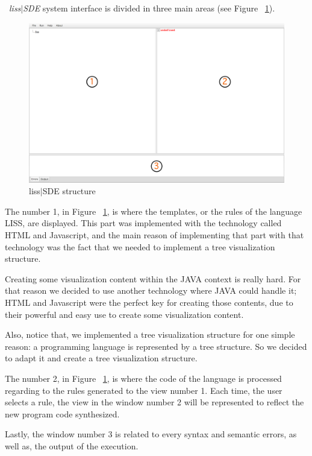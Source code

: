 \documentclass[
  oneside,
  11pt, a4paper,
  footinclude=true,
  headinclude=true,
  cleardoublepage=empty
]{scrbook}
\begin{document}
~\textit{liss$|$SDE} system interface is divided in three main areas (see Figure ~\ref{fig:LISS-SDE_structure}).

\begin{figure}[h!]
  \centering
    \includegraphics[width=1\textwidth]{img/LISS-SDE_organization.png}
    \caption{liss$|$SDE structure}
    \label{fig:LISS-SDE_structure}
\end{figure}

The number 1, in Figure ~\ref{fig:LISS-SDE_structure}, is where the templates, or the rules of the language LISS, are displayed. This part was implemented with the technology called HTML and Javascript, and the main reason of implementing that part with that technology was the fact that we needed to implement a tree visualization structure. 

Creating some visualization content within the JAVA context is really hard. For that reason we decided to use another technology where JAVA could handle it; HTML and Javascript were the perfect key for creating those contents, due to their powerful and easy use to create some visualization content.

Also, notice that, we implemented a tree visualization structure for one simple reason: a programming language is represented by a tree structure. So we decided to adapt it and create a tree visualization structure.

The number 2, in Figure ~\ref{fig:LISS-SDE_structure}, is where the code of the language is processed regarding to the rules generated to the view number 1. Each time, the user selects a rule, the view in the window number 2 will be represented to reflect the new program code synthesized.

Lastly, the window number 3 is related to every syntax and semantic errors, as well as, the output of the execution.
\end{document}
